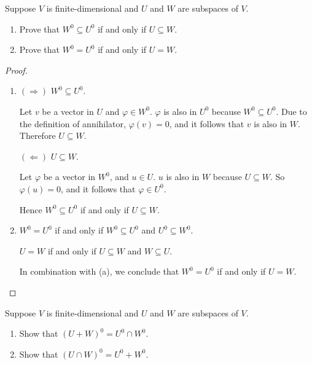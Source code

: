 \begin{exercise}
    Suppose $V$ is finite-dimensional and $U$ and $W$ are subspaces of $V$.
    \begin{enumerate}[label={(\alph*)}]
        \item Prove that $W^{0}\subseteq U^{0}$ if and only if $U\subseteq W$.
        \item Prove that $W^{0} = U^{0}$ if and only if $U = W$.
    \end{enumerate}
\end{exercise}

\begin{proof}
    \begin{enumerate}[label={(\alph*)}]
        \item $(\Rightarrow)$ $W^{0}\subseteq U^{0}$.

              Let $v$ be a vector in $U$ and $\varphi\in W^{0}$. $\varphi$ is also in $U^{0}$ because $W^{0}\subseteq U^{0}$. Due to the definition of annihilator, $\varphi(v) = 0$, and it follows that $v$ is also in $W$. Therefore $U\subseteq W$.

              $(\Leftarrow)$ $U\subseteq W$.

              Let $\varphi$ be a vector in $W^{0}$, and $u\in U$. $u$ is also in $W$ because $U\subseteq W$. So $\varphi(u) = 0$, and it follows that $\varphi\in U^{0}$.

              Hence $W^{0}\subseteq U^{0}$ if and only if $U\subseteq W$.
        \item $W^{0} = U^{0}$ if and only if $W^{0}\subseteq U^{0}$ and $U^{0}\subseteq W^{0}$.

              $U = W$ if and only if $U\subseteq W$ and $W\subseteq U$.

              In combination with (a), we conclude that $W^{0} = U^{0}$ if and only if $U = W$.\qedhere
    \end{enumerate}
\end{proof}
\newpage

\begin{exercise}\label{chapter3:sectionF:exercise22}
    Suppose $V$ is finite-dimensional and $U$ and $W$ are subspaces of $V$.
    \begin{enumerate}[label={(\alph*)}]
        \item Show that ${(U + W)}^{0} = U^{0}\cap W^{0}$.
        \item Show that ${(U\cap W)}^{0} = U^{0} + W^{0}$.
    \end{enumerate}
\end{exercise}

